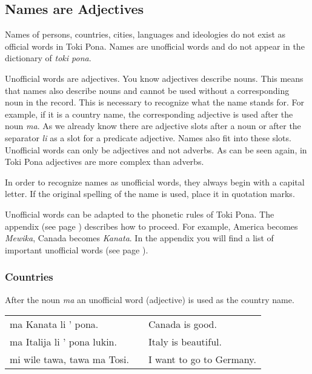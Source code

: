 \subsection*{Names are Adjectives}
\label{'unofficial_words_intro'}
%
%
Names of persons, countries, cities, languages and ideologies do not exist as official words in Toki Pona. 
Names are unofficial words and do not appear in the dictionary of \textit{toki pona}.

Unofficial words are adjectives.
You know adjectives describe nouns. 
This means that names also describe nouns and cannot be used without a corresponding noun in the record.
This is necessary to recognize what the name stands for. 
For example, if it is a country name, the corresponding adjective is used after the noun \textit{ma}. 
As we already know there are adjective slots after a noun or after the separator \textit{li} as a slot for a predicate adjective. 
Names also fit into these slots.
Unofficial words can only be adjectives and not adverbs. 
As can be seen again, in Toki Pona adjectives are more complex than adverbs. 

In order to recognize names as unofficial words, they always begin with a capital letter. 
If the original spelling of the name is used, place it in quotation marks.

Unofficial words can be adapted to the phonetic rules of Toki Pona.
The appendix (see page \pageref{'phonet_trans'}) describes how to proceed.
For example, America becomes \textit{Mewika}, Canada becomes \textit{Kanata}.
In the appendix you will find a list of important unofficial words (see page \pageref{'unofficial_words'}). 
%
\subsubsection*{Countries}
%
After the noun \textit{ma} an unofficial word (adjective) is used as the country name. 

\begin{supertabular}{p{5,5cm}|ll}
ma Kanata li ' pona. && Canada is good. \\
ma Italija li ' pona lukin. && Italy is beautiful. \\
mi wile tawa, tawa ma Tosi. && I want to go to Germany. \\
\end{supertabular} 

